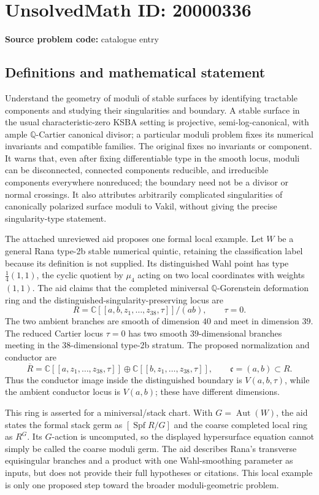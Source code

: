 \documentclass[11pt]{article}
\newcommand{\Q}{\mathbb{Q}}
\newcommand{\C}{\mathbb{C}}
\begin{document}
\section*{UnsolvedMath ID: 20000336}
\textbf{Source problem code:} catalogue entry
\subsection{Definitions and mathematical statement}
Understand the geometry of moduli of stable surfaces by identifying tractable components and studying their singularities and boundary. A stable surface in the usual characteristic-zero KSBA setting is projective, semi-log-canonical, with ample $\Q$-Cartier canonical divisor; a particular moduli problem fixes its numerical invariants and compatible families. The original fixes no invariants or component. It warns that, even after fixing differentiable type in the smooth locus, moduli can be disconnected, connected components reducible, and irreducible components everywhere nonreduced; the boundary need not be a divisor or normal crossings. It also attributes arbitrarily complicated singularities of canonically polarized surface moduli to Vakil, without giving the precise singularity-type statement.

The attached unreviewed aid proposes one formal local example. Let $W$ be a general Rana type-2b stable numerical quintic, retaining the classification label because its definition is not supplied. Its distinguished Wahl point has type $\frac14(1,1)$, the cyclic quotient by $\mu_4$ acting on two local coordinates with weights $(1,1)$. The aid claims that the completed miniversal $\Q$-Gorenstein deformation ring and the distinguished-singularity-preserving locus are
\[
R=\C[[a,b,z_1,\ldots,z_{38},\tau]]/(ab),\qquad \tau=0.
\]
The two ambient branches are smooth of dimension $40$ and meet in dimension $39$. The reduced Cartier locus $\tau=0$ has two smooth $39$-dimensional branches meeting in the $38$-dimensional type-2b stratum. The proposed normalization and conductor are
\[
\overline R=\C[[a,z_1,\ldots,z_{38},\tau]]\oplus
\C[[b,z_1,\ldots,z_{38},\tau]],\qquad
\mathfrak c=(a,b)\subset R.
\]
Thus the conductor image inside the distinguished boundary is $V(a,b,\tau)$, while the ambient conductor locus is $V(a,b)$; these have different dimensions.

This ring is asserted for a miniversal/stack chart. With $G=\operatorname{Aut}(W)$, the aid states the formal stack germ as $[\operatorname{Spf}R/G]$ and the coarse completed local ring as $R^G$. Its $G$-action is uncomputed, so the displayed hypersurface equation cannot simply be called the coarse moduli germ. The aid describes Rana's transverse equisingular branches and a product with one Wahl-smoothing parameter as inputs, but does not provide their full hypotheses or citations. This local example is only one proposed step toward the broader moduli-geometric problem.
\end{document}
